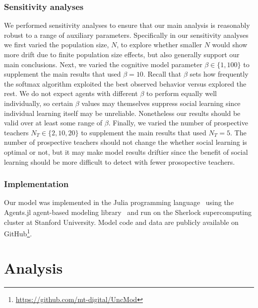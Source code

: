 \documentclass[letterpaper,11.5pt]{scrartcl}
\begin{document}
\subsubsection{Sensitivity analyses}

We performed sensitivity analyses to ensure that our main analysis is reasonably
robust to a range of auxiliary parameters. Specifically in our sensitivity analyses
we first varied the population size, $N$, to explore whether smaller $N$ would 
show more drift due to finite population size effects, but also generally support
our main conclusions. Next, we varied the
cognitive model parameter $\beta \in \{1, 100\}$ to supplement the main results
that used $\beta = 10$. Recall that $\beta$ sets how frequently the softmax algorithm
exploited the best observed behavior versus explored the rest. We do not
expect agents with different $\beta$ to perform equally well 
individually, so certain $\beta$ values may themselves suppress social learning
since individual learning itself may be unreliable. Nonetheless our results
should be valid over at least some range of $\beta$. Finally, we varied the
number of prospective teachers $N_T \in \{2, 10, 20\}$ 
to supplement the main results that used $N_T = 5$. The number of prospective
teachers should not change the whether social learning is optimal or not, 
but it may make model results driftier since the benefit of social learning should
be more difficult to detect with fewer prosopective teachers.


\subsubsection{Implementation}
Our model was implemented in the Julia programming language~\cite{Bezanson2017} 
using the Agents.jl agent-based modeling library~\cite{Datseris2022} and run
on the Sherlock supercomputing cluster at Stanford University. Model code and
data are publicly available on GitHub\footnote{\url{https://github.com/mt-digital/UncMod}}.


\section{Analysis}
\end{document}
